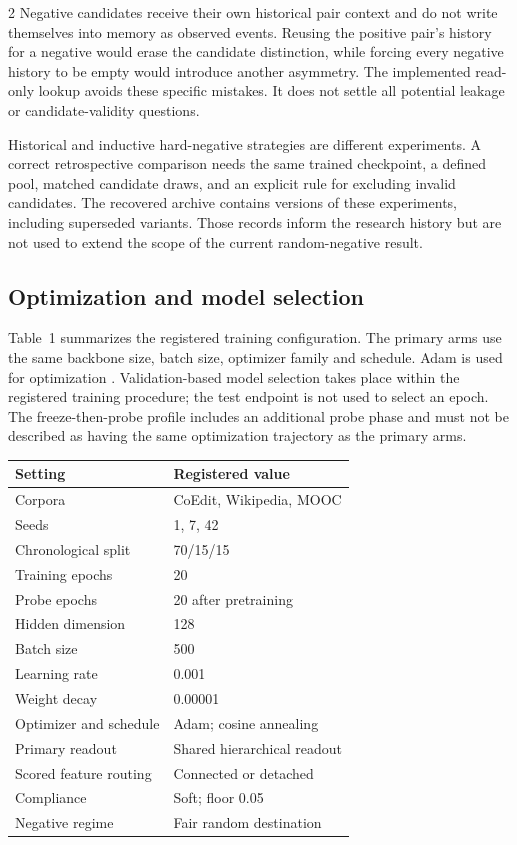 \documentclass[a4paper,10pt]{article}
\renewcommand{\small}{\fontsize{8}{12}\selectfont}
\begin{document}
\begin{multicols}{2}
Negative candidates receive their own historical pair context and do not write themselves into memory as observed events. Reusing the positive pair's history for a negative would erase the candidate distinction, while forcing every negative history to be empty would introduce another asymmetry. The implemented read-only lookup avoids these specific mistakes. It does not settle all potential leakage or candidate-validity questions.

Historical and inductive hard-negative strategies are different experiments. A correct retrospective comparison needs the same trained checkpoint, a defined pool, matched candidate draws, and an explicit rule for excluding invalid candidates. The recovered archive contains versions of these experiments, including superseded variants. Those records inform the research history but are not used to extend the scope of the current random-negative result.

\subsection{Optimization and model selection}
Table~1 summarizes the registered training configuration. The primary arms use the same backbone size, batch size, optimizer family and schedule. Adam is used for optimization \cite{adam}. Validation-based model selection takes place within the registered training procedure; the test endpoint is not used to select an epoch. The freeze-then-probe profile includes an additional probe phase and must not be described as having the same optimization trajectory as the primary arms.

\begin{center}
\small
\begin{tabular}{@{}p{3.5cm}p{3.7cm}@{}}
\toprule
Setting & Registered value\\ \midrule
Corpora & CoEdit, Wikipedia, MOOC\\
Seeds & 1, 7, 42\\
Chronological split & 70/15/15\\
Training epochs & 20\\
Probe epochs & 20 after pretraining\\
Hidden dimension & 128\\
Batch size & 500\\
Learning rate & 0.001\\
Weight decay & 0.00001\\
Optimizer and schedule & Adam; cosine annealing\\
Primary readout & Shared hierarchical readout\\
Scored feature routing & Connected or detached\\
Compliance & Soft; floor 0.05\\
Negative regime & Fair random destination\\
\bottomrule
\end{tabular}
\end{center}


\end{multicols}
\end{document}
